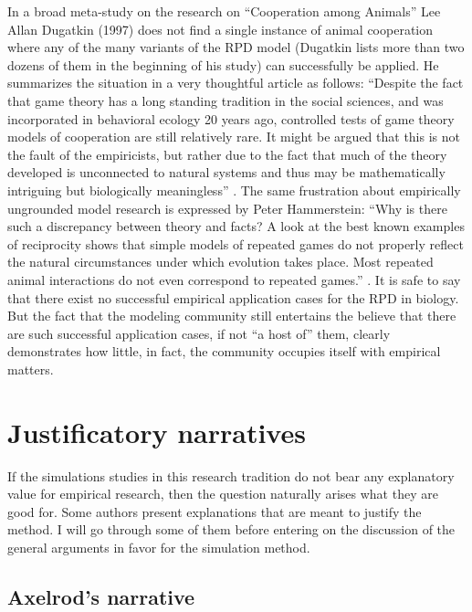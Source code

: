 \documentclass[graybox, English]{svmult}
\begin{document}
In a broad meta-study on the research on “Cooperation among Animals”
Lee Allan Dugatkin (1997) does not find a single instance of
animal cooperation where any of the many variants of the RPD model
(Dugatkin lists more than two dozens of them in the beginning of his
study) can successfully be applied. He summarizes the situation in a
very thoughtful article as follows: “Despite the fact that game theory
has a long standing tradition in the social sciences, and was
incorporated in behavioral ecology 20 years ago, controlled tests of
game theory models of cooperation are still relatively rare. It might
be argued that this is not the fault of the empiricists, but rather
due to the fact that much of the theory developed is unconnected to
natural systems and thus may be mathematically intriguing but
biologically meaningless” \citep[57]{dugatkin:1998}. The same
frustration about empirically ungrounded model research is expressed
by Peter Hammerstein: “Why is there such a discrepancy between theory
and facts? A look at the best known examples of reciprocity shows that
simple models of repeated games do not properly reflect the natural
circumstances under which evolution takes place. Most repeated animal
interactions do not even correspond to repeated games.”
\cite[83]{hammerstein:2003}. It is safe to say that there exist no
successful empirical application cases for the RPD in
biology. But the fact that the modeling community still
entertains the believe that there are such successful application
cases, if not ``a host of'' them, clearly demonstrates how
little, in fact, the community occupies itself with empirical matters.

\section{Justificatory narratives}

If the simulations studies in this research tradition do not bear any
explanatory value for empirical research, then the question naturally
arises what they are good for. Some authors present explanations that
are meant to justify the method. I will go through some of them before
entering on the discussion of the general arguments in favor for the
simulation method.

\subsection{Axelrod's narrative}
\end{document}

